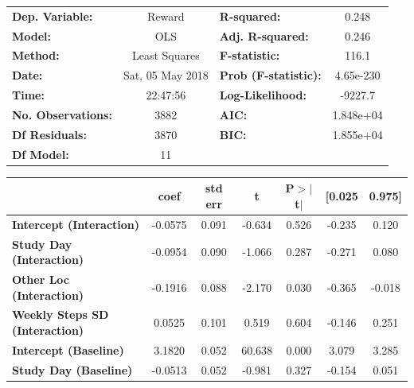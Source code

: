 \begin{table}
\begin{tabular}{lclc}
\toprule
\textbf{Dep. Variable:}                &      Reward       & \textbf{  R-squared:         } &     0.248   \\
\textbf{Model:}                        &       OLS        & \textbf{  Adj. R-squared:    } &     0.246   \\
\textbf{Method:}                       &  Least Squares   & \textbf{  F-statistic:       } &     116.1   \\
\textbf{Date:}                         & Sat, 05 May 2018 & \textbf{  Prob (F-statistic):} & 4.65e-230   \\
\textbf{Time:}                         &     22:47:56     & \textbf{  Log-Likelihood:    } &   -9227.7   \\
\textbf{No. Observations:}             &        3882      & \textbf{  AIC:               } & 1.848e+04   \\
\textbf{Df Residuals:}                 &        3870      & \textbf{  BIC:               } & 1.855e+04   \\
\textbf{Df Model:}                     &          11      & \textbf{                     } &             \\
\bottomrule
\end{tabular}
\begin{tabular}{lcccccc}
                                       & \textbf{coef} & \textbf{std err} & \textbf{t} & \textbf{P$>$$|$t$|$} & \textbf{[0.025} & \textbf{0.975]}  \\
\midrule
\textbf{Intercept (Interaction)}       &      -0.0575  &        0.091     &    -0.634  &         0.526        &       -0.235    &        0.120     \\
\textbf{Study Day (Interaction)}       &      -0.0954  &        0.090     &    -1.066  &         0.287        &       -0.271    &        0.080     \\
\textbf{Other Loc (Interaction)}       &      -0.1916  &        0.088     &    -2.170  &         0.030        &       -0.365    &       -0.018     \\
\textbf{Weekly Steps SD (Interaction)} &       0.0525  &        0.101     &     0.519  &         0.604        &       -0.146    &        0.251     \\
\textbf{Intercept (Baseline)}          &       3.1820  &        0.052     &    60.638  &         0.000        &        3.079    &        3.285     \\
\textbf{Study Day (Baseline)}          &      -0.0513  &        0.052     &    -0.981  &         0.327        &       -0.154    &        0.051     \\

\end{tabular}
\end{table}
